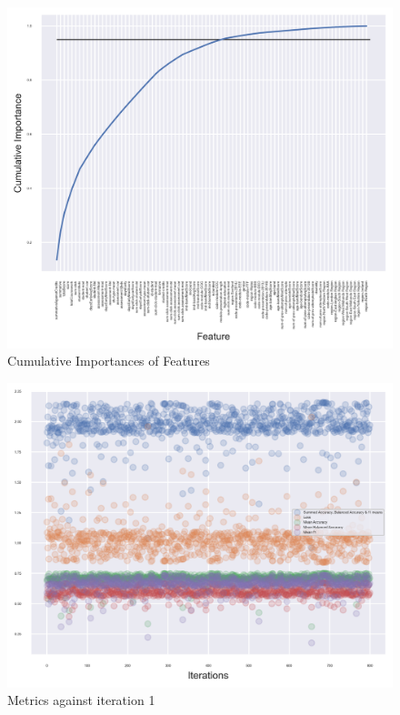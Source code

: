 \documentclass[11pt, a4paper]{article}
\begin{document}
\begin{multicols}{2}
\centering
\begin{figure}[H]
	\vspace{-0.4cm}
	\includegraphics[width=\linewidth]{Importances.png}
	\caption{Cumulative Importances of Features}
	\label{fig:importances}
\end{figure}

\centering
\begin{figure}[H]
	\vspace{-0.4cm}
	\includegraphics[width=\linewidth]{Accuracy_against_iteration1.png} 
	\caption{Metrics against iteration 1}
	\label{fig:Acc1}
\end{figure}


\end{multicols}
\end{document}
